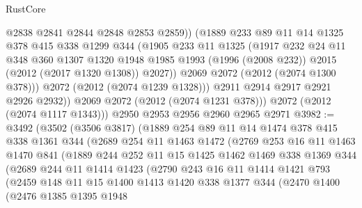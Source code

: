 \begin{lexlean}{RustCore}
\begin{coremodule}
                  @2838
                  @2841
                  @2844
                  @2848
                  @2853
                  @2859))
              (@1889
                @233
                @89
                @11
                @14
                @1325
                @378
                @415
                @338
                @1299
                @344
                (@1905
                  @233
                  @11
                  @1325
                  (@1917
                    @232
                    @24
                    @11
                    @348
                    @360
                    @1307
                    @1320
                    @1948
                    @1985
                    @1993
                    (@1996 (@2008 @232))
                    @2015
                    (@2012 (@2017 @1320 @1308))
                    @2027))
                @2069
                @2072
                (@2012 (@2074 @1300 @378)))
              @2072
              (@2012 (@2074 @1239 @1328)))
            @2911
            @2914
            @2917
            @2921
            @2926
            @2932))
        @2069
        @2072
        (@2012 (@2074 @1231 @378)))
      @2072
      (@2012 (@2074 @1117 @1343)))
    @2950
    @2953
    @2956
    @2960
    @2965
    @2971
@3982 := @3492
    (@3502
      (@3506 @3817)
      (@1889
        @254
        @89
        @11
        @14
        @1474
        @378
        @415
        @338
        @1361
        @344
        (@2689
          @254
          @11
          @1463
          @1472
          (@2769
            @253
            @16
            @11
            @1463
            @1470
            @841
            (@1889
              @244
              @252
              @11
              @15
              @1425
              @1462
              @1469
              @338
              @1369
              @344
              (@2689
                @244
                @11
                @1414
                @1423
                (@2790
                  @243
                  @16
                  @11
                  @1414
                  @1421
                  @793
                  (@2459
                    @148
                    @11
                    @15
                    @1400
                    @1413
                    @1420
                    @338
                    @1377
                    @344
                    (@2470
                      @1400
                      (@2476
                        @1385
                        @1395
                        @1948

\end{coremodule}
\end{lexlean}
